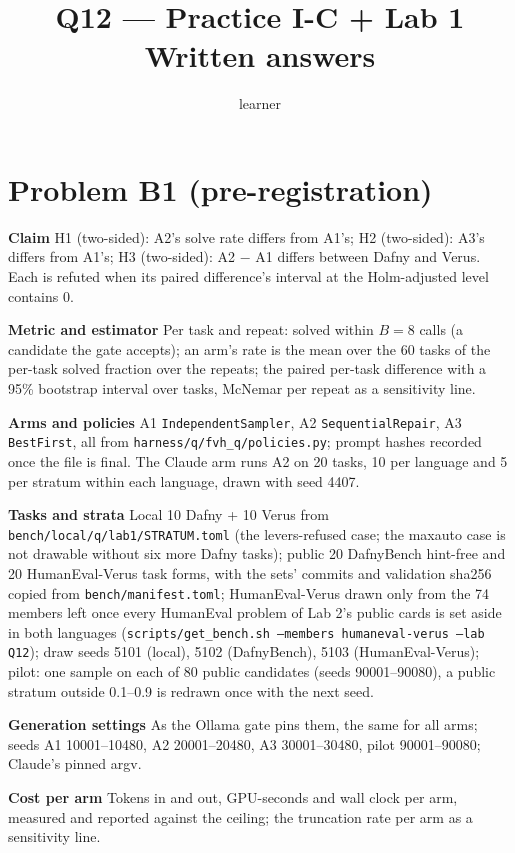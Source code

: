 \documentclass[11pt]{article}
\title{Q12 --- Practice I-C + Lab 1 \\ \large Written answers}
\author{learner}
\date{}
\begin{document}
\maketitle
\sloppy

\section*{Problem B1 (pre-registration)}\label{ans:B1}
\begin{answer}
\textbf{Claim} H1 (two-sided): A2's solve rate differs from A1's; H2 (two-sided):
A3's differs from A1's; H3 (two-sided): A2 $-$ A1 differs between Dafny and Verus. Each
is refuted when its paired difference's interval at the Holm-adjusted level contains 0.

\textbf{Metric and estimator} Per task and repeat: solved within $B = 8$ calls (a
candidate the gate accepts); an arm's rate is the mean over the 60 tasks of the
per-task solved fraction over the repeats; the paired per-task difference with a 95\%
bootstrap interval over tasks, McNemar per repeat as a sensitivity line.

\textbf{Arms and policies} A1 \texttt{IndependentSampler}, A2 \texttt{SequentialRepair},
A3 \texttt{BestFirst}, all from \texttt{harness/q/fvh\_q/policies.py}; prompt hashes
recorded once the file is final. The Claude arm runs A2 on 20 tasks, 10 per language
and 5 per stratum within each language, drawn with seed 4407.

\textbf{Tasks and strata} Local 10 Dafny + 10 Verus from
\texttt{bench/local/q/lab1/STRATUM.toml} (the levers-refused case; the maxauto case is
not drawable without six more Dafny tasks); public 20 DafnyBench hint-free and 20
HumanEval-Verus task forms, with the sets' commits and validation sha256 copied from
\texttt{bench/manifest.toml}; HumanEval-Verus drawn only from the 74 members left once
every HumanEval problem of Lab 2's public cards is set aside in both languages
(\texttt{scripts/get\_bench.sh --members humaneval-verus --lab Q12}); draw seeds 5101 (local), 5102 (DafnyBench), 5103 (HumanEval-Verus); pilot: one sample on each of 80 public
candidates (seeds 90001--90080), a public stratum outside 0.1--0.9 is redrawn once with
the next seed.

\textbf{Generation settings} As the Ollama gate pins them, the same for all arms;
seeds A1 10001--10480, A2 20001--20480, A3 30001--30480, pilot 90001--90080; Claude's
pinned argv.

\textbf{Cost per arm} Tokens in and out, GPU-seconds and wall clock per arm, measured
and reported against the ceiling; the truncation rate per arm as a sensitivity line.


\end{answer}
\end{document}
